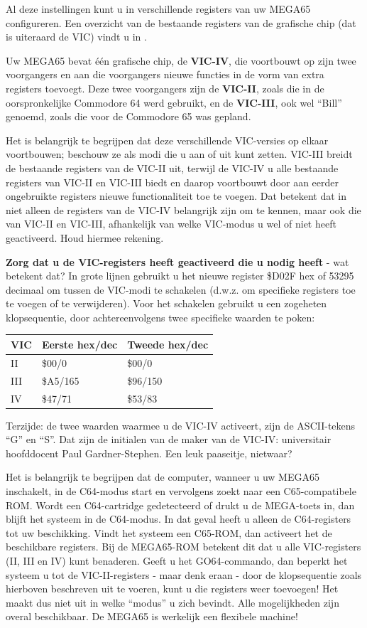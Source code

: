 Al deze instellingen kunt u in verschillende registers van uw MEGA65 configureren. Een overzicht van de bestaande registers van de grafische chip (dat is uiteraard de VIC) vindt u in .

Uw MEGA65 bevat één grafische chip, de \textbf{VIC-IV}, die voortbouwt op zijn twee voorgangers en aan die voorgangers nieuwe functies in de vorm van extra registers toevoegt. Deze twee voorgangers zijn de \textbf{VIC-II}, zoals die in de oorspronkelijke Commodore 64 werd gebruikt, en de \textbf{VIC-III}, ook wel ``Bill'' genoemd, zoals die voor de Commodore 65 was gepland.

Het is belangrijk te begrijpen dat deze verschillende VIC-versies op elkaar voortbouwen; beschouw ze als modi die u aan of uit kunt zetten. VIC-III breidt de bestaande registers van de VIC-II uit, terwijl de VIC-IV u alle bestaande registers van VIC-II en VIC-III biedt en daarop voortbouwt door aan eerder ongebruikte registers nieuwe functionaliteit toe te voegen. Dat betekent dat in  niet alleen de registers van de VIC-IV belangrijk zijn om te kennen, maar ook die van VIC-II en VIC-III, afhankelijk van welke VIC-modus u wel of niet heeft geactiveerd. Houd hiermee rekening.

\textbf{Zorg dat u de VIC-registers heeft geactiveerd die u nodig heeft} - wat betekent dat? In grote lijnen gebruikt u het nieuwe register \$D02F hex of 53295 decimaal om tussen de VIC-modi te schakelen (d.w.z. om specifieke registers toe te voegen of te verwijderen). Voor het schakelen gebruikt u een zogeheten klopsequentie, door achtereenvolgens twee specifieke waarden te poken:

\begin{tabular}{|l|l|l|}
	\hline
	VIC & Eerste hex/dec & Tweede hex/dec \\
	\hline
	II  & \$00/0 & \$00/0\\	III & \$A5/165 & \$96/150\\	IV  & \$47/71 & \$53/83\\
	\hline
\end{tabular}

Terzijde: de twee waarden waarmee u de VIC-IV activeert, zijn de ASCII-tekens ``G'' en ``S''. Dat zijn de initialen van de maker van de VIC-IV: universitair hoofddocent Paul Gardner-Stephen. Een leuk paaseitje, nietwaar?

Het is belangrijk te begrijpen dat de computer, wanneer u uw MEGA65 inschakelt, in de C64-modus start en vervolgens zoekt naar een C65-compatibele ROM. Wordt een C64-cartridge gedetecteerd of drukt u de MEGA-toets in, dan blijft het systeem in de C64-modus. In dat geval heeft u alleen de C64-registers tot uw beschikking. Vindt het systeem een C65-ROM, dan activeert het de beschikbare registers. Bij de MEGA65-ROM betekent dit dat u alle VIC-registers (II, III en IV) kunt benaderen. Geeft u het GO64-commando, dan beperkt het systeem u tot de VIC-II-registers - maar denk eraan - door de klopsequentie zoals hierboven beschreven uit te voeren, kunt u die registers weer toevoegen! Het maakt dus niet uit in welke ``modus'' u zich bevindt. Alle mogelijkheden zijn overal beschikbaar. De MEGA65 is werkelijk een flexibele machine!


